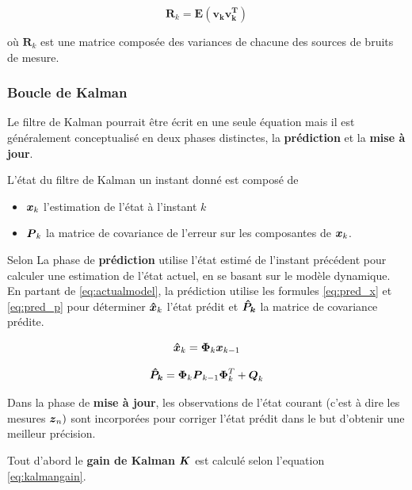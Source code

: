 \documentclass[12pt,a4paper]{report}
\begin{document}
	\begin{equation}
	  \boldsymbol R_k = \boldsymbol{E(v_k v_k^T)}
	\end{equation}

	\para où $\boldsymbol R_k$ est une matrice composée des variances de chacune des sources de bruits de mesure.
	
	\subsubsection{Boucle de Kalman}
	\label{sec:boucledekalman}
	
	Le filtre de Kalman pourrait être écrit en une seule équation mais il est généralement conceptualisé en deux phases distinctes, la \textbf{prédiction} et la \textbf{mise à jour}.
	
	\para L'état du filtre de Kalman un instant donné est composé de \begin{itemize}
		\item $\boldsymbol{x}_k$ l'estimation de l'état à l'instant $k$
		\item $\boldsymbol{P}_k$ la matrice de covariance de l'erreur sur les composantes de $\boldsymbol{x}_k$.
	\end{itemize}

	\para Selon \cite{menegatti_generalized_2016} La phase de \textbf{prédiction} utilise l'état estimé de l'instant précédent pour calculer une estimation de l'état actuel, en se basant sur le modèle dynamique. En partant de \ref{eq:actualmodel}, la prédiction utilise les formules \ref{eq:pred_x} et \ref{eq:pred_p} pour déterminer $\boldsymbol{\hat{x}}_k$ l'état prédit et $\boldsymbol{\hat{P}_k}$ la matrice de covariance prédite.
	
	\begin{equation}
		\label{eq:pred_x}
		\boldsymbol{\hat{x}}_k = \boldsymbol{\Phi}_k \boldsymbol{x}_{k-1}
	\end{equation}
	
	\begin{equation}
		\label{eq:pred_p}
		\boldsymbol{\hat{P}_k} = \boldsymbol{\Phi}_k \boldsymbol{P}_{k-1} \boldsymbol{\Phi}_k^T + \boldsymbol{Q}_k
	\end{equation}
	
	
	
	\para Dans la phase de \textbf{mise à jour}, les observations de l'état courant (c'est à dire les mesures $\boldsymbol{z}_n)$ sont incorporées pour corriger l'état prédit dans le but d'obtenir une meilleur précision.
	
	\para Tout d'abord le \textbf{gain de Kalman} $\boldsymbol{K}$ est calculé selon l'equation \ref{eq:kalmangain}.
	
\end{document}
